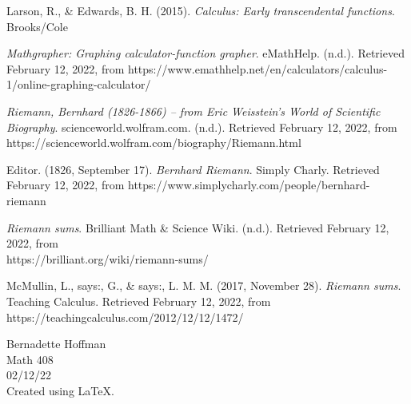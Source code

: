 \documentclass[12pt]{article}
\begin{document}
\bigskip

\noindent Larson, R., \& Edwards, B. H. (2015). \textit{Calculus: Early transcendental functions}. Brooks/Cole

\bigskip

\noindent \textit{Mathgrapher: Graphing calculator-function grapher}. eMathHelp. (n.d.). Retrieved February 12, 2022, from https://www.emathhelp.net/en/calculators/calculus-1/online-graphing-calculator/ 

\bigskip

\noindent \textit{Riemann, Bernhard (1826-1866) -- from Eric Weisstein's World of Scientific Biography}. scienceworld.wolfram.com. (n.d.). Retrieved February 12, 2022, from \\ https://scienceworld.wolfram.com/biography/Riemann.html 

\bigskip

\noindent Editor. (1826, September 17). \textit{Bernhard Riemann}. Simply Charly. Retrieved February 12, 2022, from https://www.simplycharly.com/people/bernhard-riemann 

\bigskip

\noindent \textit{Riemann sums}. Brilliant Math \& Science Wiki. (n.d.). Retrieved February 12, 2022, from \\ https://brilliant.org/wiki/riemann-sums/ 

\bigskip

\noindent McMullin, L., says:, G., \& says:, L. M. M. (2017, November 28). \textit{Riemann sums}. Teaching Calculus. Retrieved February 12, 2022, from https://teachingcalculus.com/2012/12/12/1472/



\vspace{2in}
\begin{center}
Bernadette Hoffman \\
Math 408\\
02/12/22\\
Created using \LaTeX.
\end{center}
\end{document}
